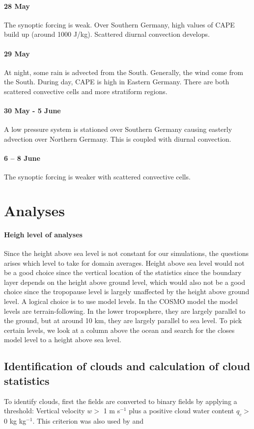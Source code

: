 \documentclass[a4paper, 12pt]{article}
\begin{document}
\paragraph{28 May} The synoptic forcing is weak. Over Southern Germany, high values of CAPE build up (around 1000 J/kg). Scattered diurnal convection develops.
\paragraph{29 May} At night, some rain is advected from the South. Generally, the wind come from the South. During day, CAPE is high in Eastern Germany. There are both scattered convective cells and more stratiform regions.
\paragraph{30 May - 5 June} A low pressure system is stationed over Southern Germany causing easterly advection over Northern Germany. This is coupled with diurnal convection.
\paragraph{6 -- 8 June} The synoptic forcing is weaker with scattered convective cells.

\section{Analyses}

\paragraph{Heigh level of analyses}
Since the height above sea level is not constant for our simulations, the questions arises which level to take for domain averages. Height above sea level would not be a good choice since the vertical location of the statistics since the boundary layer depends on the height above ground level, which would also not be a good choice since the tropopause level is largely unaffected by the height above ground level. A logical choice is to use model levels. In the COSMO model the model levels are terrain-following. In the lower troposphere, they are largely parallel to the ground, but at around 10 km, they are largely parallel to sea level. To pick certain levels, we look at a column above the ocean and search for the closes model level to a height above sea level. 

\subsection{Identification of clouds and calculation of cloud statistics}
To identify clouds, first the fields are converted to binary fields by applying a threshold: Vertical velocity $w >$ 1 m s$^{-1}$ plus a positive cloud water content $q_c >$ 0 kg kg$^{-1}$. This criterion was also used by \cite{Cohen2006} and \cite{Davoudi2010}
\end{document}
